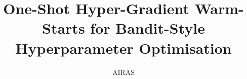 \usepackage{float}

\usepackage{algorithm}
\usepackage{algorithmicx}
\usepackage{algpseudocode}

\usepackage{hyperref}
\usepackage{cleveref}

\usepackage{microtype}
\usepackage{booktabs}

\title{One-Shot Hyper-Gradient Warm-Starts for Bandit-Style Hyperparameter Optimisation}

\author{AIRAS}



\maketitle






